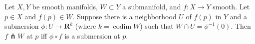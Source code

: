 Let $X, Y$ be smooth manifolds, $W \subset Y$ a submanifold, and $f: X \to Y$ smooth. Let $p \in X$ and $f(p) \in W$. Suppose there is a neighborhood $U$ of $f(p)$ in $Y$ and a submersion $\phi: U \to \mathbf{R}^k$ (where $k = \operatorname{codim} W$) such that $W \cap U = \phi^{-1}(0)$. Then $f \pitchfork W$ at $p$ iff $\phi \circ f$ is a submersion at $p$.